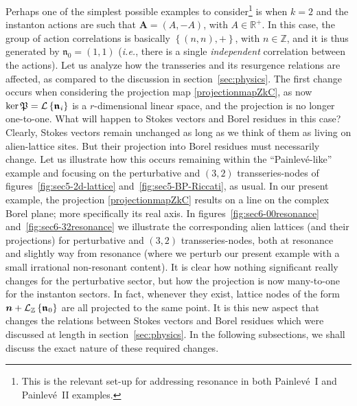 \documentclass[11pt,a4paper]{article}
\newcommand{\CL}{{\cal L}}
\def\BZ{{\mathbb Z}}
\def\BR{{\mathbb R}}
\begin{document}
Perhaps one of the simplest possible examples to consider\footnote{This is the relevant set-up for addressing resonance in both Painlev\'e~I \cite{gikm10, asv11} and Painlev\'e~II \cite{sv13} examples.} is when $k=2$ and the instanton actions are such that $\boldsymbol{A} = \left( A, -A \right)$, with $A \in \BR^+$. In this case, the group of action correlations is  basically $\left\{ \left( n,n \right), + \right\}$, with $n \in \BZ$, and it is thus generated by $\boldsymbol{\mathfrak{n}}_0 = \left( 1,1 \right)$ (\textit{i.e.}, there is a single \textit{independent} correlation between the actions). Let us analyze how the transseries and its resurgence relations are affected, as compared to the discussion in section~\ref{sec:physics}. The first change occurs when considering the projection map \eqref{projectionmapZkC}, as now $\ker \mathfrak{P} = \CL \left\{ \boldsymbol{\mathfrak{n}}_i \right\}$ is a $r$-dimensional linear space, and the projection is no longer one-to-one. What will happen to Stokes vectors and Borel residues in this case? Clearly, Stokes vectors remain unchanged as long as we think of them as living on alien-lattice sites. But their projection into Borel residues must necessarily change. Let us illustrate how this occurs remaining within the ``Painlev\'e-like'' example and focusing on the perturbative and $(3,2)$ transseries-nodes of figures~\ref{fig:sec5-2d-lattice} and~\ref{fig:sec5-BP-Riccati}, as usual. In our present example, the projection \eqref{projectionmapZkC} results on a line on the complex Borel plane; more specifically its real axis. In figures~\ref{fig:sec6-00resonance} and~\ref{fig:sec6-32resonance} we illustrate the corresponding alien lattices (and their projections) for perturbative and $(3,2)$ transseries-nodes, both at resonance and slightly way from resonance (where we perturb our present example with a small irrational non-resonant content). It is clear how nothing significant really changes for the perturbative sector, but how the projection is now many-to-one for the instanton sectors. In fact, whenever they exist, lattice nodes of the form $\boldsymbol{n} + \CL_{\BZ} \left\{ \boldsymbol{\mathfrak{n}}_0 \right\}$ are all projected to the same point. It is this new aspect that changes the relations between Stokes vectors and Borel residues which were discussed at length in section~\ref{sec:physics}. In the following subsections, we shall discuss the exact nature of these required changes.
\end{document}
